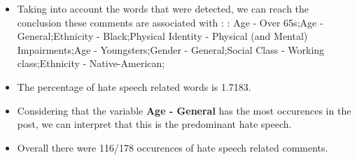\documentclass[11pt]{article}
\begin{document}
\begin{itemize}\item Taking into account the words that were detected, we can reach the conclusion these comments are associated with : : Age - Over 65s;Age - General;Ethnicity - Black;Physical Identity - Physical (and Mental) Impairments;Age - Youngsters;Gender - General;Social Class - Working class;Ethnicity - Native-American;%

\item The percentage of hate speech related words is 1.7183.

\item Considering that the variable \textbf{Age - General} has the most occurences in the post, we can interpret that this is the predominant hate speech.

\item Overall there were 116/178 occurences of hate speech related comments.\end{itemize}
\end{document}
